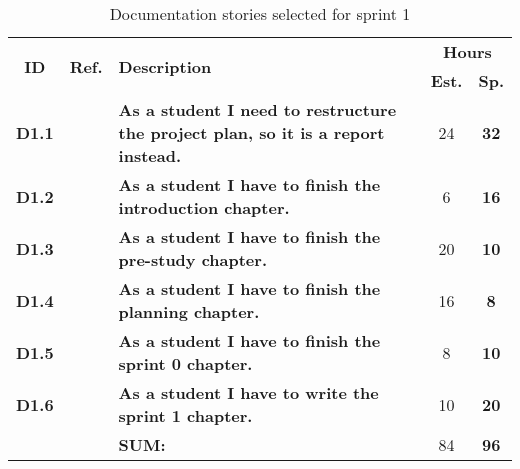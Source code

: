 \def\arraystretch{1.25}
\begin{longtable}{ccXcc}
\label{tab:sprint1Documentationstories}\\[-6mm]
\caption{Documentation stories selected for sprint 1}\\[-4mm]
\toprule[0.5mm]
\multirow{2}{*}{\textbf{ID}} &
\multirow{2}{*}{\textbf{Ref.}} & \multirow{2}{*}{\textbf{Description}} & \multicolumn{2}{c}{\textbf{Hours}} \\
 					& & & \textbf{Est.} & \textbf{Sp.} \\
\midrule
\textbf{D1.1} 	&& {\bf As a student I need to restructure the project plan, so it is a report instead.}	& 	 	24	& \textbf{32} \\

\textbf{D1.2} 	&& {\bf As a student I have to finish the introduction chapter.} 							& 		6	& \textbf{16} \\

\textbf{D1.3} 	&& {\bf As a student I have to finish the pre-study chapter.} 								& 		20	& \textbf{10} \\

\textbf{D1.4} 	&& {\bf As a student I have to finish the planning chapter.} 								& 		16	& \textbf{8} \\

\textbf{D1.5} 	&& {\bf As a student I have to finish the sprint 0 chapter.} 								& 		8	& \textbf{10} \\

\textbf{D1.6} 	&& {\bf As a student I have to write the sprint 1 chapter.} 								& 		10	& \textbf{20} \\							
				
\hline
				&& \textbf{SUM:}		&		84	& \textbf{96}
 \\																			
\bottomrule[0.5mm]
\end{longtable}
